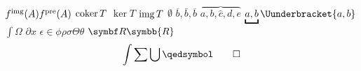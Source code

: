 \documentclass[12pt]{article}
\begin{document}
\( f^{\operatorname{img}}(A) f^{\operatorname{pre}}(A) \)
\( \operatorname{coker} T\)
\( \ker T\)
\( \operatorname{img} T \)
\( \emptyset \)
\( \overline{b}  , \bar{b} , \overbar{b} \)
\( \overbrace{a, b, \hat{c}, d, e} \)
\( \underbracket{a, b} \Uunderbracket{a, b} \)
\( \int \Omega \)
\( \partial x \)
\( \epsilon \in \phi \rho \sigma \Theta \theta \)
\( \R \symbb{R} \)
\[ \int \sum \bigcup \qedsymbol \qed \]

\blindtext
\end{document}
